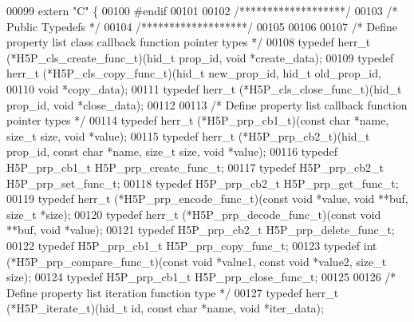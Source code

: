 \begin{DoxyCode}
00099 \textcolor{keyword}{extern} \textcolor{stringliteral}{"C"} \{
00100 \textcolor{preprocessor}{#endif}
00101 
00102 \textcolor{comment}{/*******************/}
00103 \textcolor{comment}{/* Public Typedefs */}
00104 \textcolor{comment}{/*******************/}
00105 
00106 
00107 \textcolor{comment}{/* Define property list class callback function pointer types */}
00108 \textcolor{keyword}{typedef} herr\_t (*H5P\_cls\_create\_func\_t)(hid\_t prop\_id, \textcolor{keywordtype}{void} *create\_data);
00109 \textcolor{keyword}{typedef} herr\_t (*H5P\_cls\_copy\_func\_t)(hid\_t new\_prop\_id, hid\_t old\_prop\_id,
00110                                       \textcolor{keywordtype}{void} *copy\_data);
00111 \textcolor{keyword}{typedef} herr\_t (*H5P\_cls\_close\_func\_t)(hid\_t prop\_id, \textcolor{keywordtype}{void} *close\_data);
00112 
00113 \textcolor{comment}{/* Define property list callback function pointer types */}
00114 \textcolor{keyword}{typedef} herr\_t (*H5P\_prp\_cb1\_t)(\textcolor{keyword}{const} \textcolor{keywordtype}{char} *name, \textcolor{keywordtype}{size\_t} size, \textcolor{keywordtype}{void} *value);
00115 \textcolor{keyword}{typedef} herr\_t (*H5P\_prp\_cb2\_t)(hid\_t prop\_id, \textcolor{keyword}{const} \textcolor{keywordtype}{char} *name, \textcolor{keywordtype}{size\_t} size, \textcolor{keywordtype}{void} *value);
00116 \textcolor{keyword}{typedef} H5P\_prp\_cb1\_t H5P\_prp\_create\_func\_t;
00117 \textcolor{keyword}{typedef} H5P\_prp\_cb2\_t H5P\_prp\_set\_func\_t;
00118 \textcolor{keyword}{typedef} H5P\_prp\_cb2\_t H5P\_prp\_get\_func\_t;
00119 \textcolor{keyword}{typedef} herr\_t (*H5P\_prp\_encode\_func\_t)(\textcolor{keyword}{const} \textcolor{keywordtype}{void} *value, \textcolor{keywordtype}{void} **buf, \textcolor{keywordtype}{size\_t} *size);
00120 \textcolor{keyword}{typedef} herr\_t (*H5P\_prp\_decode\_func\_t)(\textcolor{keyword}{const} \textcolor{keywordtype}{void} **buf, \textcolor{keywordtype}{void} *value);
00121 \textcolor{keyword}{typedef} H5P\_prp\_cb2\_t H5P\_prp\_delete\_func\_t;
00122 \textcolor{keyword}{typedef} H5P\_prp\_cb1\_t H5P\_prp\_copy\_func\_t;
00123 \textcolor{keyword}{typedef} int (*H5P\_prp\_compare\_func\_t)(\textcolor{keyword}{const} \textcolor{keywordtype}{void} *value1, \textcolor{keyword}{const} \textcolor{keywordtype}{void} *value2, \textcolor{keywordtype}{size\_t} size);
00124 \textcolor{keyword}{typedef} H5P\_prp\_cb1\_t H5P\_prp\_close\_func\_t;
00125 
00126 \textcolor{comment}{/* Define property list iteration function type */}
00127 \textcolor{keyword}{typedef} herr\_t (*H5P\_iterate\_t)(hid\_t id, \textcolor{keyword}{const} \textcolor{keywordtype}{char} *name, \textcolor{keywordtype}{void} *iter\_data);

\end{DoxyCode}
